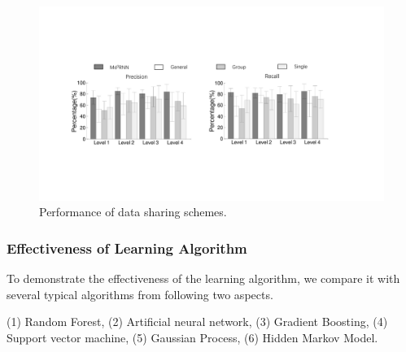 \begin{figure}[h]
  \centering
  \includegraphics[width=0.8\columnwidth]{./img/performance_of_multi_division.pdf}
  \caption{Performance of data sharing schemes. }
  \label{fig:cmp_multi_division}
\end{figure}


\subsubsection{Effectiveness of \modelname Learning Algorithm}
To demonstrate the effectiveness of the \modelname learning algorithm, we compare it with several typical algorithms from following two aspects.

(1) Random Forest, (2) Artificial neural network, (3) Gradient Boosting, (4) Support vector machine, (5) Gaussian Process, (6) Hidden Markov Model.

